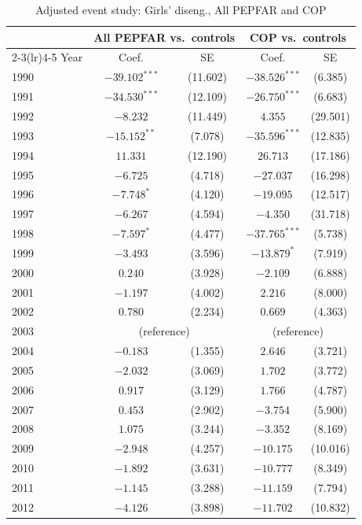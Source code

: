 \begin{table}[htbp]
\centering
\small
\caption{Adjusted event study: Girls' diseng., All PEPFAR and COP}
\label{tab:es_combined_prim_disengage_girls}
\begin{tabular}{lcccc}
\toprule
 & \multicolumn{2}{c}{All PEPFAR vs.\ controls} & \multicolumn{2}{c}{COP vs.\ controls} \\
\cmidrule(lr){2-3}\cmidrule(lr){4-5}
Year & Coef. & SE & Coef. & SE \\
\midrule
1990 & $-39.102^{***}$ & (11.602) & $-38.526^{***}$ & (6.385) \\
1991 & $-34.530^{***}$ & (12.109) & $-26.750^{***}$ & (6.683) \\
1992 & $-8.232$ & (11.449) & $4.355$ & (29.501) \\
1993 & $-15.152^{**}$ & (7.078) & $-35.596^{***}$ & (12.835) \\
1994 & $11.331$ & (12.190) & $26.713$ & (17.186) \\
1995 & $-6.725$ & (4.718) & $-27.037$ & (16.298) \\
1996 & $-7.748^{*}$ & (4.120) & $-19.095$ & (12.517) \\
1997 & $-6.267$ & (4.594) & $-4.350$ & (31.718) \\
1998 & $-7.597^{*}$ & (4.477) & $-37.765^{***}$ & (5.738) \\
1999 & $-3.493$ & (3.596) & $-13.879^{*}$ & (7.919) \\
2000 & $0.240$ & (3.928) & $-2.109$ & (6.888) \\
2001 & $-1.197$ & (4.002) & $2.216$ & (8.000) \\
2002 & $0.780$ & (2.234) & $0.669$ & (4.363) \\
2003 & \multicolumn{2}{c}{(reference)} & \multicolumn{2}{c}{(reference)} \\
2004 & $-0.183$ & (1.355) & $2.646$ & (3.721) \\
2005 & $-2.032$ & (3.069) & $1.702$ & (3.772) \\
2006 & $0.917$ & (3.129) & $1.766$ & (4.787) \\
2007 & $0.453$ & (2.902) & $-3.754$ & (5.900) \\
2008 & $1.075$ & (3.244) & $-3.352$ & (8.169) \\
2009 & $-2.948$ & (4.257) & $-10.175$ & (10.016) \\
2010 & $-1.892$ & (3.631) & $-10.777$ & (8.349) \\
2011 & $-1.145$ & (3.288) & $-11.159$ & (7.794) \\
2012 & $-4.126$ & (3.898) & $-11.702$ & (10.832) \\

\end{tabular}
\end{table}
